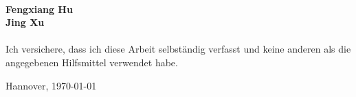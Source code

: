 \clearpage

\thispagestyle{empty}
\mbox{ }

\clearpage   


\thispagestyle{empty}

\vspace*{10cm} 
\textbf{Fengxiang Hu\\[0.2ex] Jing Xu\\[0.2ex]}\\

\vspace*{2cm} Ich versichere, dass ich diese Arbeit selbständig verfasst und keine anderen als die angegebenen Hilfsmittel verwendet habe.\\

\vspace*{3cm}

Hannover, \today

\clearpage

\thispagestyle{empty}
\mbox{ }

\clearpage   

\selectfont
{}

\tableofcontents

\ifthispageodd{\clearpage\mbox{ }\thispagestyle{empty}}{\relax}

\setcounter{page}{0}


